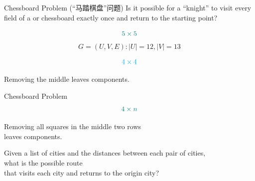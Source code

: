 \begin{frame}{}
  \begin{exampleblock}{Chessboard Problem (``马踏棋盘''问题)}
    Is it possible for a ``knight'' to visit every field of
    a  or  chessboard exactly once
    and return to the starting point?
  \end{exampleblock}

  \vspace{0.50cm}
\end{frame}

\begin{frame}{}
  \[
    \textcolor{teal}{5 \times 5}
  \]
  \pause
  \[
    G = (U, V, E): |U| = 12, |V| = 13
  \]
\end{frame}

\begin{frame}{}
  \[
    \textcolor{cyan}{4 \times 4}
  \]

  \pause
  \vspace{0.20cm}
  \begin{center}
    Removing the middle  leaves  components.
  \end{center}
\end{frame}

\begin{frame}{}
  \begin{exampleblock}{Chessboard Problem}
    \[
      \textcolor{teal}{4 \times n}
    \]
  \end{exampleblock}

  \pause
  \vspace{0.30cm}
  \begin{center}
    Removing all  squares in the middle two rows \\[3pt]
    leaves  components.
  \end{center}
\end{frame}

\begin{frame}{}
  \begin{definition}
    Given a list of cities and the distances between each pair of cities, \\[3pt]
    what is the  possible route \\[3pt]
    that visits each city  and returns to the origin city?
  \end{definition}

\end{frame}

\begin{frame}{}
\end{frame}
